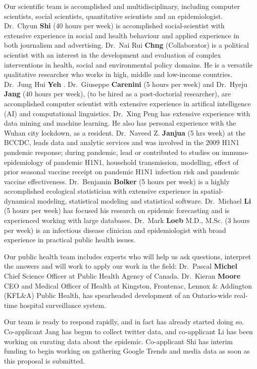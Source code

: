 Our scientific team is accomplished and multidisciplinary, including computer scientists, social scientists, quantitative scientists and an epidemiologist. 
Dr.\ Chyun \textbf{Shi} (40 hours per week) is accomplished social-scientist with extensive experience in social and health behaviour and applied experience in both journalism and advertising. 
Dr.\ Nai Rui \textbf{Chng} (Collaborator) is a political scientist with an interest in the development and evaluation of complex interventions in health, social and environmental policy domains. He is a versatile qualitative researcher who works in high, middle and low-income countries.
Dr.\ Jung Hui \textbf{Yeh} .
Dr.\ Giuseppe \textbf{Carenini} (5 hours per week) and Dr.\ Hyeju \textbf{Jang} (40 hours per week), (to be hired as a post-doctorial researcher), are accomplished computer scientist with extensive experience in artifical intelligence (AI) and computational linguistics.
Dr.\ Xing Peng  has extensive experience with data mining and machine learning. He also has personal experience with the Wuhan city lockdown, as a resident.
Dr.\ Naveed Z. \textbf{Janjua} (5 hrs week) at the BCCDC, leads data and analytic services and was involved in the 2009 H1N1 pandemic response; during pandemic, lead or contributed to studies on  immuno-epidemiology of pandemic H1N1, household transmission, modelling, effect of prior seasonal vaccine receipt on pandemic H1N1 infection risk and pandemic vaccine effectiveness. 
Dr.\ Benjamin \textbf{Bolker} (5 hours per week) is a highly accomplished ecological statistician with extensive experience in spatial-dynamical modeling, statistical modeling and statistical software.
Dr.\ Michael \textbf{Li} (5 hours per week) has focused his research on epidemic forecasting and is experienced working with large databases. 
Dr.\ Mark \textbf{Loeb} M.D., M.Sc. (3 hours per week) is an infectious disease clinician and epidemiologist with broad experience in practical public health issues.

Our public health team includes experts who will help us ask questions, interpret the answers and will work to apply our work in the field:
Dr.\ Pascal \textbf{Michel} Chief Science Officer at Public Health Agency of Canada. 
Dr.\ Kieran \textbf{Moore} CEO and Medical Officer of Health at Kingston, Frontenac, Lennox & Addington (KFL&A) Public Health, has spearheaded development of an Ontario-wide real-time hospital surveillance system.

Our team is ready to respond rapidly, and in fact has already started doing so. Co-applicant Jang has begun to collect twitter data, and co-applicant Li has been working on curating data about the epidemic. Co-applicant Shi has interim funding to begin working on gathering Google Trends and media data as soon as this proposal is submitted.

